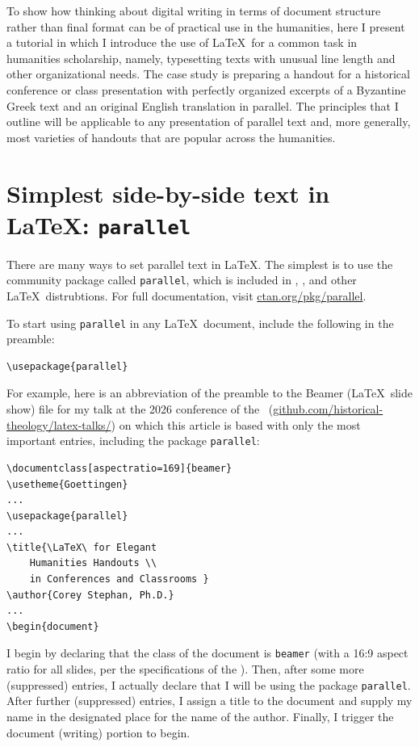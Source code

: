 \documentclass{ltugboat}
\begin{document}
To show how thinking about digital writing in terms of document structure rather than final format can be of practical use in the humanities, here I present a tutorial in which I introduce the use of \LaTeX\ for a common task in humanities scholarship, namely, typesetting texts with unusual line length and other organizational needs. The case study is preparing a handout for a historical conference or class presentation with perfectly organized excerpts of a Byzantine Greek text and an original English translation in parallel. The principles that I outline will be applicable to any presentation of parallel text and, more generally, most varieties of handouts that are popular across the humanities.

\section{Simplest side-by-side text in \LaTeX: \texttt{parallel}}

There are many ways to set parallel text in \LaTeX. The simplest is to use the community package called \texttt{parallel}, which is included in , , and other \LaTeX\ distrubtions. For full documentation, visit \url{ctan.org/pkg/parallel}.

To start using \texttt{parallel} in any \LaTeX\ document, include the following in the preamble:

\begin{verbatim}
\usepackage{parallel}
\end{verbatim}
For example, here is an abbreviation of the preamble to the Beamer (\LaTeX\ slide show) file for my talk at the 2026 conference of the \TUG\ (\url{github.com/historical-theology/latex-talks/}) on which this article is based with only the most important entries, including the package \texttt{parallel}:

\begin{verbatim}
\documentclass[aspectratio=169]{beamer}
\usetheme{Goettingen}
...
\usepackage{parallel}
...
\title{\LaTeX\ for Elegant 
	Humanities Handouts \\ 
	in Conferences and Classrooms }
\author{Corey Stephan, Ph.D.}
...
\begin{document}
\end{verbatim}
I begin by declaring that the class of the document is \texttt{beamer} (with a 16:9 aspect ratio for all slides, per the specifications of the \TUG). Then, after some more (suppressed) entries, I actually declare that I will be using the package \texttt{parallel}. After further (suppressed) entries, I assign a title to the document and supply my name in the designated place for the name of the author. Finally, I trigger the document (writing) portion to begin.
\end{document}
